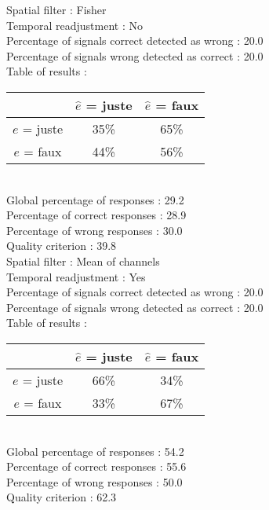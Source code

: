 Spatial filter : Fisher \\
Temporal readjustment : No \\
Percentage of signals correct detected as wrong :   20.0 \\
Percentage of signals wrong detected as correct :   20.0 \\
Table of results : \\
\begin{tabular}{|c|c|c|}
\hline				& $\hat{e}$ = juste & $\hat{e}$ = faux \\
\hline  $e$ = juste	&     35\%			&     65\%		\\
\hline  $e$ = faux	&     44\%			&     56\%		\\
\hline
\end{tabular}\\
Global percentage of responses :   29.2 \\
Percentage of correct responses :   28.9 \\
Percentage of wrong responses :   30.0 \\
Quality criterion :   39.8 \\

Spatial filter : Mean of channels \\
Temporal readjustment : Yes \\
Percentage of signals correct detected as wrong :   20.0 \\
Percentage of signals wrong detected as correct :   20.0 \\
Table of results : \\
\begin{tabular}{|c|c|c|}
\hline				& $\hat{e}$ = juste & $\hat{e}$ = faux \\
\hline  $e$ = juste	&     66\%			&     34\%		\\
\hline  $e$ = faux	&     33\%			&     67\%		\\
\hline
\end{tabular}\\
Global percentage of responses :   54.2 \\
Percentage of correct responses :   55.6 \\
Percentage of wrong responses :   50.0 \\
Quality criterion :   62.3 \\

